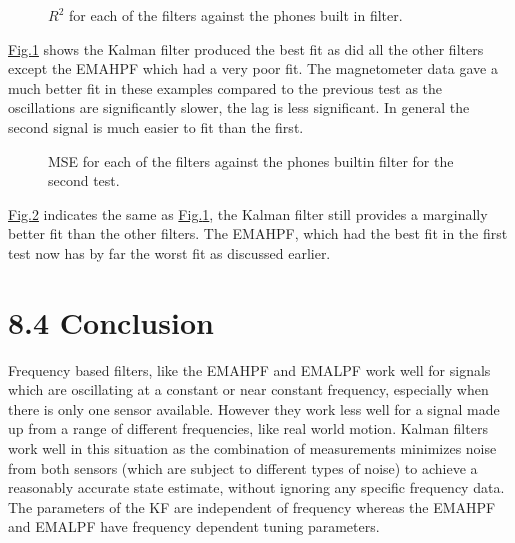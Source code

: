 \documentclass[letterpaper,10pt,english]{jupyterBook}
\begin{document}
\begin{figure}[htbp]
\centering
\capstart

\noindent{}
\caption{\(R^2\) for each of the filters against the phones built in filter.}\label{\detokenize{8TestingFilters:r-squared-test2}}\end{figure}

\sphinxAtStartPar
\hyperref[\detokenize{8TestingFilters:r-squared-test2}]{Fig.\@ \ref{\detokenize{8TestingFilters:r-squared-test2}}} shows the Kalman filter produced the best fit as did all the other filters except the EMAHPF which had a very poor fit. The magnetometer data gave a much better fit in these examples compared to the previous test as the oscillations are significantly slower, the lag is less significant. In general the second signal is much easier to fit than the first.

\begin{figure}[htbp]
\centering
\capstart

\noindent{}
\caption{MSE for each of the filters against the phones builtin filter for the second test.}\label{\detokenize{8TestingFilters:mse-test-2}}\end{figure}

\sphinxAtStartPar
\hyperref[\detokenize{8TestingFilters:mse-test-2}]{Fig.\@ \ref{\detokenize{8TestingFilters:mse-test-2}}} indicates the same as \hyperref[\detokenize{8TestingFilters:r-squared-test2}]{Fig.\@ \ref{\detokenize{8TestingFilters:r-squared-test2}}}, the Kalman filter still provides a marginally better fit than the other filters. The EMAHPF, which had the best fit in the first test now has by far the worst fit as discussed earlier.


\section{8.4 Conclusion}
\label{\detokenize{8TestingFilters:conclusion}}
\sphinxAtStartPar
Frequency based filters, like the EMAHPF and EMALPF work well for signals which are oscillating at a constant or near constant frequency, especially when there is only one sensor available. However they work less well for a signal made up from a range of different frequencies, like real world motion. Kalman filters work well in this situation as the combination of measurements minimizes noise from both sensors (which are subject to different types of noise) to achieve a reasonably accurate state estimate, without ignoring any specific frequency data. The parameters of the KF are independent of frequency whereas the EMAHPF and EMALPF have frequency dependent tuning parameters.
\end{document}

